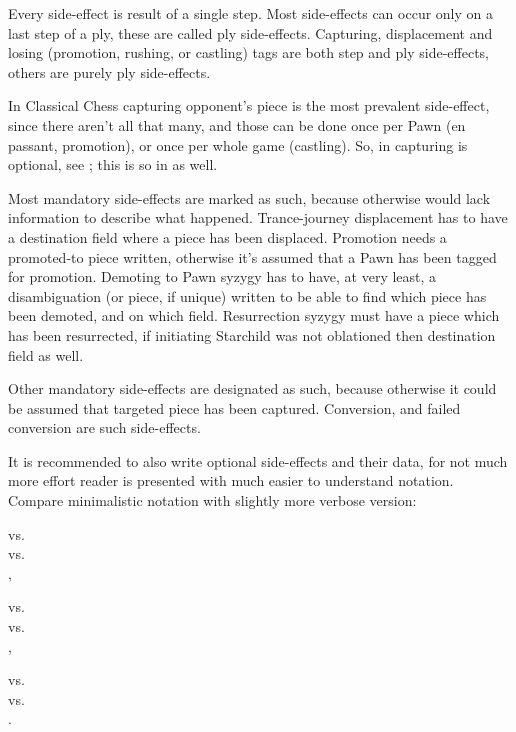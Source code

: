 Every side-effect is result of a single step. Most side-effects can occur only on
a last step of a ply, these are called ply side-effects. Capturing, displacement
and losing (promotion, rushing, or castling) tags are both step and ply side-effects,
others are purely ply side-effects.

In Classical Chess capturing opponent's piece is the most prevalent side-effect,
since there aren't all that many, and those can be done once per Pawn (en passant,
promotion), or once per whole game (castling). So, in  capturing is
optional, see ; this is so in  as well.

Most mandatory side-effects are marked as such, because otherwise 
would lack information to describe what happened. Trance-journey displacement
has to have a destination field where a piece has been displaced. Promotion
needs a promoted-to piece written, otherwise it's assumed that a Pawn has been
tagged for promotion. Demoting to Pawn syzygy has to have, at very least, a
disambiguation (or piece, if unique) written to be able to find which piece
has been demoted, and on which field. Resurrection syzygy must have a piece
which has been resurrected, if initiating Starchild was not oblationed then
destination field as well.

Other mandatory side-effects are designated as such, because otherwise it could
be assumed that targeted piece has been captured. Conversion, and failed conversion
are such side-effects.

It is recommended to also write optional side-effects and their data, for not much
more effort reader is presented with much easier to understand notation. Compare
minimalistic notation with slightly more verbose version:

\noindent
{} vs. \\
 vs. \\
,

\noindent
{} vs. \\
 vs. \\
,

\noindent
{} vs. \\
 vs. \\
.

\clearpage %

